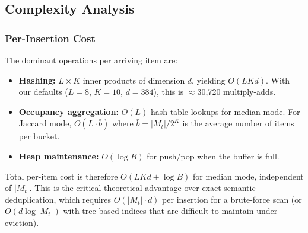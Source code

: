 \documentclass[conference]{IEEEtran}
\begin{document}
\begin{figure}[h]
\centering
{}
\label{alg:insert}
\end{figure}

\subsection{Complexity Analysis}
\label{sec:complexity}

\subsubsection{Per-Insertion Cost}
The dominant operations per arriving item are:
\begin{itemize}
\item \textbf{Hashing:} $L \times K$ inner products of dimension $d$,
      yielding $O(LKd)$. With our defaults ($L{=}8$, $K{=}10$,
      $d{=}384$), this is $\approx$30,720 multiply-adds.
\item \textbf{Occupancy aggregation:} $O(L)$ hash-table lookups for
      median mode. For Jaccard mode, $O(L \cdot \bar{b})$ where
      $\bar{b} = |M_t|/2^K$ is the average number of items per bucket.
\item \textbf{Heap maintenance:} $O(\log B)$ for push/pop when the
      buffer is full.
\end{itemize}
Total per-item cost is therefore $O(LKd + \log B)$ for median mode,
independent of $|M_t|$. This is the critical theoretical advantage over
exact semantic deduplication, which requires $O(|M_t| \cdot d)$ per
insertion for a brute-force scan (or $O(d \log |M_t|)$ with
tree-based indices that are difficult to maintain under eviction).
\end{document}
